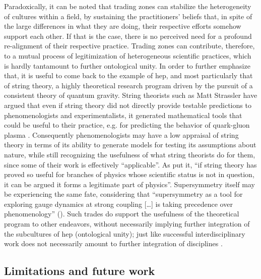 \documentclass[smallextended]{svjour3}
\begin{document}
Paradoxically, it can be noted that trading zones can stabilize the heterogeneity of cultures within a field, by sustaining the practitioners' beliefs that, in spite of the large differences in what they are doing, their respective efforts somehow support each other. If that is the case, there is no perceived need for a profound re-alignment of their respective practice. Trading zones can contribute, therefore, to a mutual process of legitimization of heterogeneous scientific practices, which is hardly tantamount to further ontological unity. In order to further emphasize that, it is useful to come back to the example of \gls{hep}, and most particularly that of string theory, a highly theoretical research program driven by the pursuit of a consistent theory of quantum gravity. String theorists such as Matt Strassler have argued that even if string theory did not directly provide testable predictions to phenomenologists and experimentalists, it generated mathematical tools that could be useful to their practice, e.g. for predicting the behavior of quark-gluon plasma \citep{Ritson2021}. Consequently phenomenologists may have a low appraisal of string theory in terms of its ability to generate models for testing its assumptions about nature, while still recognizing the usefulness of what string theorists do for them, since some of their work is effectively ``applicable''. As \citet{Ritson2015} put it, ``if string theory has proved so useful for branches of physics whose scientific status is not in question, it can be argued it forms a legitimate part of physics''. Supersymmetry itself may be experiencing the same fate, considering that ``supersymmetry as a tool for exploring gauge dynamics at strong coupling [\dots] is taking precedence over phenomenology'' (\citealt[p.~7--8]{Shifman2020}). %
Such trades do support the usefulness of the theoretical program to other endeavors, without necessarily implying further integration of the subcultures of \gls{hep} (ontological unity); just like successful interdisciplinary work does not necessarily amount to further integration of disciplines \citep{GrneYanoff2016}. 

\subsection{Limitations and future work}
\end{document}
